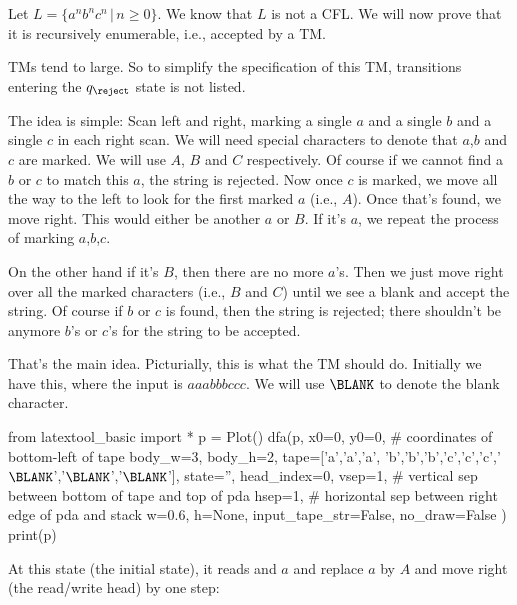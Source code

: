 \begin{eg}
Let $L = \{a^n b^n c^n \,|\, n \geq 0\}$. We know that $L$ is not
a CFL. We will now prove that it is recursively enumerable, i.e.,
accepted by a TM.

TMs tend to large. So to simplify the specification of this TM,
transitions entering the $q_{\reject}$ state is not listed.

The idea is simple: Scan left and right, marking a single $a$ and
a single $b$ and a single $c$ in each right scan. We will need
special characters to denote that $a$,$b$ and $c$ are marked. We
will use $A$, $B$ and $C$ respectively. Of course if we cannot
find a $b$ or $c$ to match this $a$, the string is rejected. Now
once $c$ is marked, we move all the way to the left to look for
the first marked $a$ (i.e., $A$). Once that's found, we move
right. This would either be another $a$ or $B$. If it's $a$, we
repeat the process of marking $a$,$b$,$c$.

On the other hand if it's $B$, then there are no more $a$'s. Then
we just move right over all the marked characters (i.e., $B$ and
$C$) until we see a blank and accept the string. Of course if $b$
or $c$ is found, then the string is rejected; there shouldn't be
anymore $b$'s or $c$'s for the string to be accepted.

That's the main idea.
Picturially, this is what the TM should do.
Initially we have this, where the input is $aaabbbccc$.
We will use $\BLANK$ to denote the blank character.

\begin{python}
from latextool_basic import *
p = Plot()
dfa(p,
        x0=0, y0=0, # coordinates of bottom-left of tape
        body_w=3,
        body_h=2,
        tape=['a','a','a', 'b','b','b','c','c','c','$\BLANK$','$\BLANK$','$\BLANK$'], state='',
        head_index=0,
        vsep=1,  # vertical sep between bottom of tape and top of pda
        hsep=1,  # horizontal sep between right edge of pda and stack
        w=0.6, h=None,
        input_tape_str=False,
        no_draw=False
        )
print(p)
\end{python}

At this state (the initial state), it reads and $a$ and replace $a$ by $A$
and move right (the read/write head) by one step:


\end{eg}

